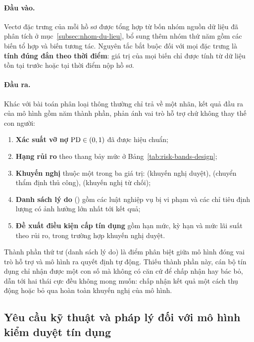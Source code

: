 \paragraph{Đầu vào.} Vectơ đặc trưng của mỗi hồ sơ được tổng hợp từ bốn nhóm
nguồn dữ liệu đã phân tích ở mục~\ref{subsec:nhom-du-lieu}, bổ sung thêm nhóm thứ
năm gồm các biến tổ hợp và biến tương tác. Nguyên tắc bắt buộc đối với mọi đặc
trưng là \textbf{tính đúng đắn theo thời điểm}: giá trị của mọi biến chỉ được
tính từ dữ liệu tồn tại trước hoặc tại thời điểm nộp hồ sơ.

\paragraph{Đầu ra.} Khác với bài toán phân loại thông thường chỉ trả về một nhãn,
kết quả đầu ra của mô hình gồm năm thành phần, phản ánh vai trò hỗ trợ chứ không
thay thế con người:

\begin{enumerate}[label=(\arabic*)]
  \item \textbf{Xác suất vỡ nợ} $\mathrm{PD} \in (0, 1)$ đã được hiệu chuẩn;
  \item \textbf{Hạng rủi ro} theo thang bảy mức ở Bảng~\ref{tab:risk-bands-design};
  \item \textbf{Khuyến nghị} thuộc một trong ba giá trị:  (khuyến
  nghị duyệt),  (chuyển thẩm định thủ công),  (khuyến
  nghị từ chối);
  \item \textbf{Danh sách lý do} () gồm các luật nghiệp vụ bị
  vi phạm và các chỉ tiêu định lượng có ảnh hưởng lớn nhất tới kết quả;
  \item \textbf{Đề xuất điều kiện cấp tín dụng} gồm hạn mức, kỳ hạn và mức lãi
  suất theo rủi ro, trong trường hợp khuyến nghị duyệt.
\end{enumerate}

Thành phần thứ tư (danh sách lý do) là điểm phân biệt giữa mô hình đóng vai trò
hỗ trợ và mô hình ra quyết định tự động. Thiếu thành phần này, cán bộ tín dụng
chỉ nhận được
một con số mà không có căn cứ để chấp nhận hay bác bỏ, dẫn tới hai thái cực đều
không mong muốn: chấp nhận kết quả một cách thụ động hoặc bỏ qua hoàn toàn khuyến
nghị của mô hình.

\subsection{Yêu cầu kỹ thuật và pháp lý đối với mô hình kiểm duyệt tín dụng}
\label{subsec:yeu-cau}

